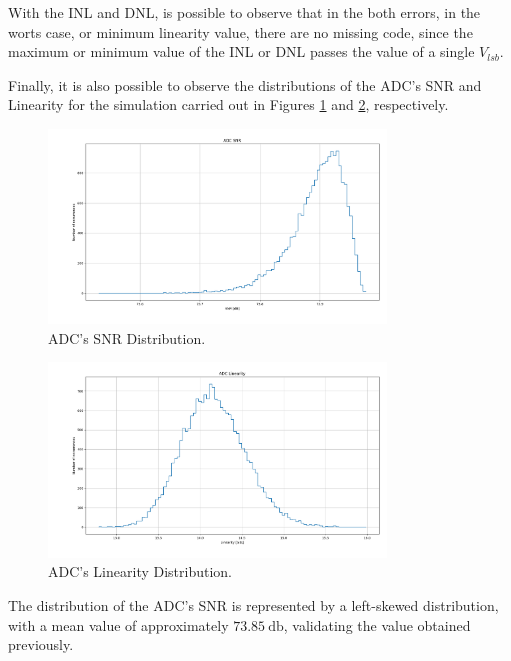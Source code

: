 With the INL and DNL, is possible to observe that in the both errors, in the worts case, or minimum linearity value, there are no missing code, since the maximum or minimum value of the INL or DNL passes the value of a single $V_{lsb}$. 

Finally, it is also possible to observe the distributions of the ADC's SNR and Linearity for the simulation carried out in Figures \ref{fig:ADC_SNR_ALLCAPS} and \ref{fig:ADC_LIN_ALLCAPS}, respectively.

\begin{figure}[H]

    \centering
    \includegraphics*[width=0.8\textwidth]{Images/SNR_All_Caps_20Ksim_s0011.png}
    \caption{ADC's SNR Distribution.}
    \label{fig:ADC_SNR_ALLCAPS}
\end{figure}

\begin{figure}[H]

    \centering
    \includegraphics*[width=0.8\textwidth]{Images/LIN_All_Caps_20Ksim_s0011.png}
    \caption{ADC's Linearity Distribution.}

    \label{fig:ADC_LIN_ALLCAPS}
\end{figure}

The distribution of the ADC's SNR is represented by a left-skewed distribution, with a mean value of approximately $\SI{73.85}{\decibel}$, validating the value obtained previously.

